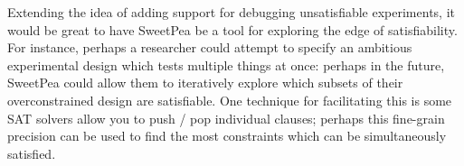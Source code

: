 Extending the idea of adding support for debugging unsatisfiable experiments, it would be great to have SweetPea be a tool for exploring the edge of satisfiability. For instance, perhaps a researcher could attempt to specify an ambitious experimental design which tests multiple things at once: perhaps in the future, SweetPea could allow them to iteratively explore which subsets of their overconstrained design are satisfiable. One technique for facilitating this is some SAT solvers allow you to push / pop individual clauses; perhaps this fine-grain precision can be used to find the most constraints which can be simultaneously satisfied.

%
%
%
%

%
